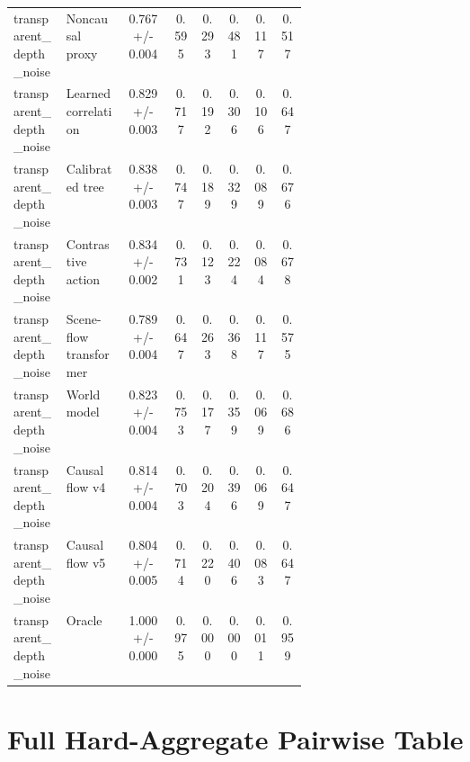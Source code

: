 \documentclass{article}
\begin{document}
\begin{center}
\begin{longtable}{p{0.18\linewidth}p{0.20\linewidth}cccccc}
transparent\_depth\_noise & Noncausal proxy & 0.767 +/- 0.004 & 0.595 & 0.293 & 0.481 & 0.117 & 0.517\\
transparent\_depth\_noise & Learned correlation & 0.829 +/- 0.003 & 0.717 & 0.192 & 0.306 & 0.106 & 0.647\\
transparent\_depth\_noise & Calibrated tree & 0.838 +/- 0.003 & 0.747 & 0.189 & 0.329 & 0.089 & 0.676\\
transparent\_depth\_noise & Contrastive action & 0.834 +/- 0.002 & 0.731 & 0.123 & 0.224 & 0.084 & 0.678\\
transparent\_depth\_noise & Scene-flow transformer & 0.789 +/- 0.004 & 0.647 & 0.263 & 0.368 & 0.117 & 0.575\\
transparent\_depth\_noise & World model & 0.823 +/- 0.004 & 0.753 & 0.177 & 0.359 & 0.069 & 0.686\\
transparent\_depth\_noise & Causal flow v4 & 0.814 +/- 0.004 & 0.703 & 0.204 & 0.396 & 0.069 & 0.647\\
transparent\_depth\_noise & Causal flow v5 & 0.804 +/- 0.005 & 0.714 & 0.220 & 0.406 & 0.083 & 0.647\\
transparent\_depth\_noise & Oracle & 1.000 +/- 0.000 & 0.975 & 0.000 & 0.000 & 0.011 & 0.959\\
\bottomrule
\end{longtable}
\normalsize
\end{center}

\section{Full Hard-Aggregate Pairwise Table}
\end{document}
